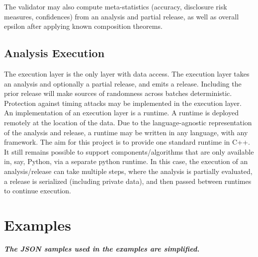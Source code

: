 \documentclass[11pt]{article}
\begin{document}
The validator may also compute meta-statistics (accuracy, disclosure risk measures, confidences) from an analysis and partial release, as well as overall epsilon after applying known composition theorems.

\subsection{Analysis Execution}
The execution layer is the only layer with data access. The execution layer takes an analysis and optionally a partial release, and emits a release. Including the prior release will make sources of randomness across batches deterministic. Protection against timing attacks may be implemented in the execution layer. \\

An implementation of an execution layer is a runtime. A runtime is deployed remotely at the location of the data. Due to the language-agnostic representation of the analysis and release, a runtime may be written in any language, with any framework. The aim for this project is to provide one standard runtime in C++. It still remains possible to support components/algorithms that are only available in, say, Python, via a separate python runtime. In this case, the execution of an analysis/release can take multiple steps, where the analysis is partially evaluated, a release is serialized (including private data), and then passed between runtimes to continue execution.

\section{Examples}
\textbf{\textit{The JSON samples used in the examples are simplified.}} 
\end{document}
